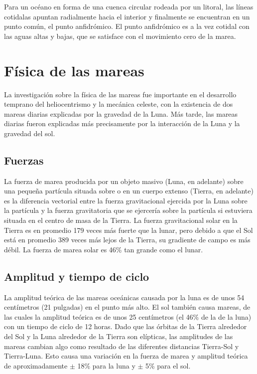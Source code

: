 \documentclass[12pt]{article}
\begin{document}
\begin{doublespace}
Para un océano en forma de una cuenca circular rodeada por un litoral, las líneas cotidalas apuntan radialmente hacia el interior y finalmente se encuentran en un punto común, el punto anfidrómico. El punto anfidrómico es a la vez cotidal con las aguas altas y bajas, que se satisface con el movimiento cero de la marea. 

\section*{Física de las mareas}
La investigación sobre la física de las mareas fue importante en el desarrollo temprano del heliocentrismo y la mecánica celeste, con la existencia de dos mareas diarias explicadas por la gravedad de la Luna. Más tarde, las mareas diarias fueron explicadas más precisamente por la interacción de la Luna y la gravedad del sol.

\subsection*{Fuerzas}
La fuerza de marea producida por un objeto masivo (Luna, en adelante) sobre una pequeña partícula situada sobre o en un cuerpo extenso (Tierra, en adelante) es la diferencia vectorial entre la fuerza gravitacional ejercida por la Luna sobre la partícula y la fuerza gravitatoria que se ejercería sobre la partícula si estuviera situada en el centro de masa de la Tierra. La fuerza gravitacional solar en la Tierra es en promedio 179 veces más fuerte que la lunar, pero debido a que el Sol está en promedio 389 veces más lejos de la Tierra, su gradiente de campo es más débil. La fuerza de marea solar es 46\% tan grande como el lunar.

\subsection*{Amplitud y tiempo de ciclo}
La amplitud teórica de las mareas oceánicas causada por la luna es de unos 54 centímetros (21 pulgadas) en el punto más alto. El sol también causa mareas, de las cuales la amplitud teórica es de unos 25 centímetros (el 46\% de la de la luna) con un tiempo de ciclo de 12 horas. Dado que las órbitas de la Tierra alrededor del Sol y la Luna alrededor de la Tierra son elípticas, las amplitudes de las mareas cambian algo como resultado de las diferentes distancias Tierra-Sol y Tierra-Luna. Esto causa una variación en la fuerza de marea y amplitud teórica de aproximadamente  $\pm$ 18\% para la luna y $\pm$ 5\% para el sol.


\end{doublespace}
\end{document}
